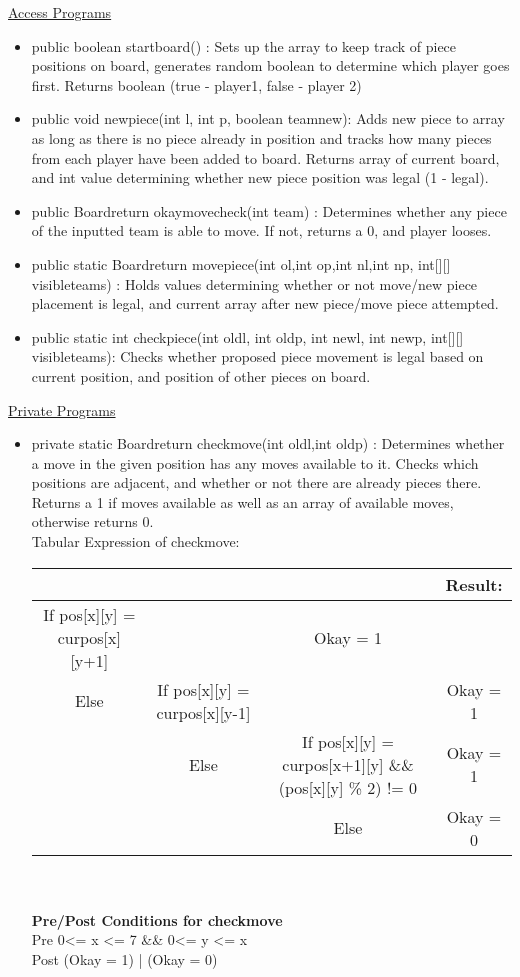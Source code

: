 \documentclass[12pt]{article}
\begin{document}
\begin{itemize}
\begin{itemize}
	
\end{itemize}
\underline{Access Programs}
\begin{itemize}
	\item public boolean startboard() : Sets up the array to keep track of piece positions on board, generates random boolean to determine which player goes first. Returns boolean (true - player1, false - player 2)
	\item public void newpiece(int l, int p, boolean teamnew): Adds new piece to array as long as there is no piece already in position and tracks how many pieces from each player have been added to board. Returns array of current board, and int value determining whether new piece position was legal (1 - legal).
	\item public Boardreturn okaymovecheck(int team) : Determines whether any piece of the inputted team is able to move. If not, returns a 0, and player looses.
	\item public static Boardreturn movepiece(int ol,int op,int nl,int np, int[][] visibleteams) : Holds values determining whether or not move/new piece placement is legal, and current array after new piece/move piece attempted.
	\item public static int checkpiece(int oldl, int oldp, int newl, int newp, int[][] visibleteams): Checks whether proposed piece movement is legal based on current position, and position of other pieces on board. 
\end{itemize}
\underline{Private Programs}
\begin{itemize}
	\item private static Boardreturn checkmove(int oldl,int oldp) : Determines whether a move in the given position has any moves available to it. Checks which positions are adjacent, and whether or not there are already pieces there. Returns a 1 if moves available as well as an array of available moves, otherwise returns 0.  \\ \newpage
	Tabular Expression of checkmove: \\
\begin{tabularx}{\linewidth}{|C|C|C|C|}
	\hline 
	&&& Result: \\ \hline 
	If pos[x][y] = curpos[x][y+1] & & Okay = 1 \\ \hline 
	Else & If pos[x][y] = curpos[x][y-1] & & Okay = 1 \\ \hline 
	 & Else & If pos[x][y] = curpos[x+1][y] \&\& (pos[x][y] \% 2) != 0 & Okay = 1 \\ \hline 
	 & & Else &	Okay = 0 \\ \hline  
\end{tabularx} \\ \\
\textbf{Pre/Post Conditions for checkmove} \\
Pre 0<= x <= 7 \&\& 0<= y <= x \\
Post (Okay = 1) | (Okay = 0)\\
\end{itemize}    


\end{itemize}
\end{document}
